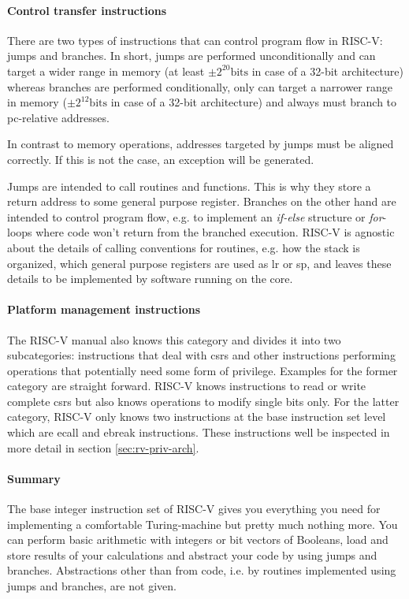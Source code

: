 \paragraph{Control transfer instructions}
There are two types of instructions that can control program flow in RISC-V: jumps and branches.
In short, jumps are performed unconditionally and can target a wider range in memory (at least $ \pm 2^{20}\text{bits} $ in case of a 32-bit architecture) whereas branches are performed conditionally, only can target a narrower range in memory ($ \pm 2^{12}\text{bits} $ in case of a 32-bit architecture) and always must branch to \gls{pc}-relative addresses.

In contrast to memory operations, addresses targeted by jumps must be aligned correctly.
If this is not the case, an exception will be generated.

Jumps are intended to call routines and functions.
This is why they store a return address to some general purpose register.
Branches on the other hand are intended to control program flow, e.g. to implement an \textit{if-else} structure or \textit{for}-loops where code won't return from the branched execution.
RISC-V is agnostic about the details of calling conventions for routines, e.g. how the stack is organized, which general purpose registers are used as \gls{lr} or \gls{sp}, and leaves these details to be implemented by software running on the core.

\paragraph{Platform management instructions}
The RISC-V manual also knows this category and divides it into two subcategories: instructions that deal with \glspl{csr} and other instructions performing operations that potentially need some form of privilege.
Examples for the former category are straight forward.
RISC-V knows instructions to read or write complete \glspl{csr} but also knows operations to modify single bits only.
For the latter category, RISC-V only knows two instructions at the base instruction set level which are \gls{ecall} and \gls{ebreak} instructions.
These instructions well be inspected in more detail in section \ref{sec:rv-priv-arch}.

\paragraph{Summary}
The base integer instruction set of RISC-V gives you everything you need for implementing a comfortable Turing-machine but pretty much nothing more.
You can perform basic arithmetic with integers or bit vectors of Booleans, load and store results of your calculations and abstract your code by using jumps and branches.
Abstractions other than from code, i.e. by routines implemented using jumps and branches, are not given.

